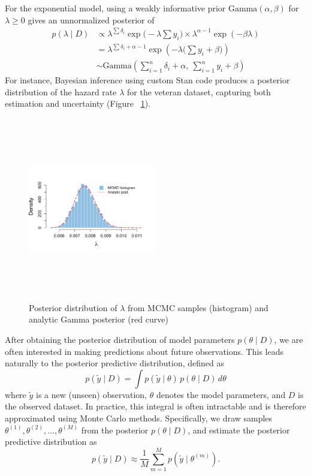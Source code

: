 For the exponential model, using a weakly informative prior $\text{Gamma}(\alpha, \beta)$ for $\lambda \ge 0$ gives an unnormalized posterior of 
\begin{align}
p(\lambda\mid D)
&\propto
\lambda^{\sum \delta_i}
\exp\Big(-\lambda \sum y_i\Big)
\times
\lambda^{\alpha - 1}
\exp(-\beta \lambda)\\
&=\lambda^{\sum \delta_i + \alpha - 1}
\exp \left( - \lambda \big(\sum y_i + \beta\big) \right) \\
&\sim
\text{Gamma}
\left(
\sum_{i=1}^{n} \delta_i + \alpha,\ \sum_{i=1}^{n} y_i + \beta
\right)
\label{eq:17}
\end{align}
For instance, Bayesian inference using custom Stan code produces a posterior distribution of the hazard rate $\lambda$ for the veteran dataset, capturing both estimation and uncertainty (Figure ~\ref{fig:exp veteran}).
\begin{figure}[H]
    \centering
    \includegraphics[height=8cm, width=0.5\textwidth]{images/veteran_post_lam.png}
    \caption{Posterior distribution of $\lambda$ from MCMC samples (histogram) and analytic Gamma posterior (red curve)}
    \label{fig:exp veteran}
\end{figure}


After obtaining the posterior distribution of model parameters $p(\theta \mid D)$, we are often interested in making predictions about future observations. This leads naturally to the posterior predictive distribution, defined as
\begin{equation}
    p(\tilde{y} \mid D) = \int p(\tilde{y} \mid \theta)\, p(\theta \mid D)\, d\theta
    \label{eq:18}
\end{equation}
where $\tilde{y}$ is a new (unseen) observation, $\theta$ denotes the model parameters, and $D$ is the observed dataset. In practice, this integral is often intractable and is therefore approximated using Monte Carlo methods. Specifically, we draw samples $\theta^{(1)}, \theta^{(2)}, \dots, \theta^{(M)}$ from the posterior $p(\theta \mid D)$, and estimate the posterior predictive distribution as
\begin{equation}
p(\tilde{y} \mid D) \approx \frac{1}{M} \sum_{m=1}^{M} p(\tilde{y} \mid \theta^{(m)}).
\end{equation}

